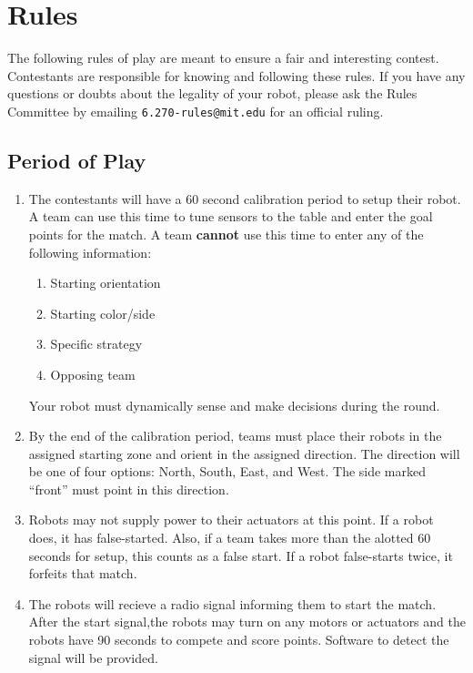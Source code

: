 \section{Rules}

The following rules of play are meant to ensure a fair and interesting contest.
Contestants are responsible for knowing and following these rules. If you have
any questions or doubts about the legality of your robot, please ask the Rules
Committee by emailing \verb^6.270-rules@mit.edu^ for an official ruling.

\subsection{Period of Play}
\begin{enumerate}


\item The contestants will have a 60 second calibration period to setup their
robot. A team can use this time to tune sensors to the table and enter the
goal points for the match. A team {\bf cannot} use this time to enter any of
the following information:

\begin{enumerate}
\item Starting orientation
\item Starting color/side
\item Specific strategy
\item Opposing team
\end{enumerate}

Your robot must dynamically sense and make decisions during the round.

\item By the end of the calibration period, teams must place their robots in
the assigned starting zone and orient in the assigned direction. The direction
will be one of four options: North, South, East, and West. The side marked
``front'' must point in this direction.

\item Robots may not supply power to their actuators at this point.  If a robot
does, it has false-started. Also, if a team takes more than the alotted 60
seconds for setup, this counts as a false start.  If a robot false-starts twice,
it forfeits that match.

\item The robots will recieve a radio signal informing them to start the match.
After the start signal,the robots may turn on any motors or actuators and the
robots have 90 seconds to compete and score points. Software to detect the
signal will be provided.


\end{enumerate}
